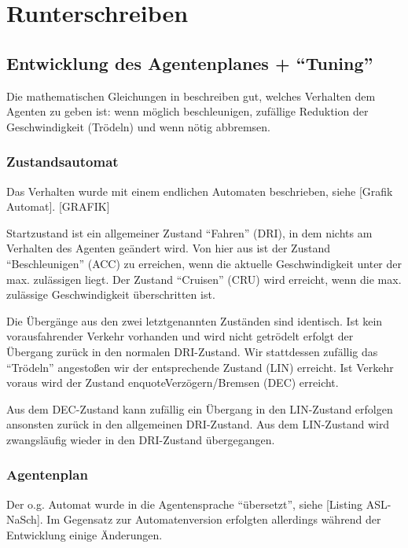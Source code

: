  \section{Runterschreiben}
\label{sec:rusch}



\subsection{Entwicklung des Agentenplanes + \enquote{Tuning}}

Die mathematischen Gleichungen in \cite{na-sch} beschreiben gut, welches Verhalten dem Agenten zu geben ist: wenn möglich beschleunigen, zufällige Reduktion der Geschwindigkeit (Trödeln) und wenn nötig abbremsen.

\subsubsection{Zustandsautomat}

Das Verhalten wurde mit einem endlichen Automaten beschrieben, siehe [Grafik Automat].
[GRAFIK]

Startzustand ist ein allgemeiner Zustand \enquote{Fahren} (DRI), in dem nichts am Verhalten des Agenten geändert wird.
Von hier aus ist der Zustand \enquote{Beschleunigen} (ACC) zu erreichen, wenn die aktuelle Geschwindigkeit unter der max. zulässigen liegt. 
Der Zustand \enquote{Cruisen} (CRU) wird erreicht, wenn die max. zulässige Geschwindigkeit überschritten ist.

Die Übergänge aus den zwei letztgenannten Zuständen sind identisch. 
Ist kein vorausfahrender Verkehr vorhanden und wird nicht getrödelt erfolgt der Übergang zurück in den normalen DRI-Zustand.
Wir stattdessen zufällig das \enquote{Trödeln} angestoßen wir der entsprechende Zustand (LIN) erreicht.
Ist Verkehr voraus wird der Zustand enquote{Verzögern/Bremsen} (DEC) erreicht.

Aus dem DEC-Zustand kann zufällig ein Übergang in den LIN-Zustand erfolgen ansonsten zurück in den allgemeinen DRI-Zustand.
Aus dem LIN-Zustand wird zwangsläufig wieder in den DRI-Zustand übergegangen.

\subsubsection{Agentenplan}

Der o.g. Automat wurde in die Agentensprache \enquote{übersetzt}, siehe [Listing ASL-NaSch]. 
Im Gegensatz zur Automatenversion erfolgten allerdings während der Entwicklung einige Änderungen. 

